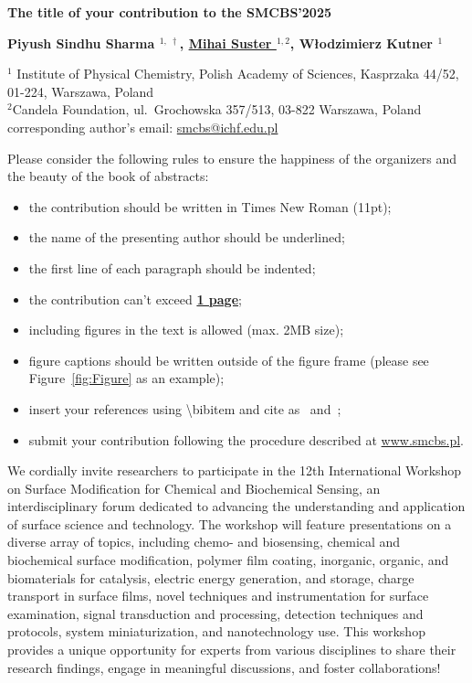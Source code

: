 \documentclass[11pt]{article}
\newcommand{\abstracttitle}[1]{
\setstretch{1.15}	%
 \begin{center}{\Large {\bf #1}}\end{center}
\setstretch{1.0}
}
\newcommand{\authors}[1]{
 \begin{center}{\bf #1} \end{center}
 \setstretch{1.0}
}
\newcommand{\addresses}[1]{
\setstretch{0.95}
 \begin{center}{\small #1} \end{center}
\setstretch{1}
}
\begin{document}
\abstracttitle{The title of your contribution to the SMCBS'2025}
\authors{
Piyush Sindhu Sharma $^{1,~\dag}$,
\underline{Mihai Suster $^{1,2}$},
Włodzimierz Kutner $^{1}$
} 

\addresses{%
$^{1}$ Institute of Physical Chemistry, Polish Academy of Sciences, Kasprzaka 44/52, 01-224, Warszawa, Poland \\
$^{2}$Candela Foundation, ul.~Grochowska 357/513, 03-822 Warszawa, Poland \\
\dag corresponding author's email:  \href{mailto:smcbs@ichf.edu.pl}{smcbs@ichf.edu.pl}
}


	Please consider the following rules to ensure the happiness of the organizers and the beauty of the book of abstracts:
\begin{itemize}	
\item the contribution should be written in Times New Roman (11pt);
\item the name of the presenting author should be underlined;
\item the first line of each paragraph should be indented;
\item the contribution can't exceed \textbf{\underline{1 page}};
\item including figures in the text is allowed (max. 2MB size);
\item figure captions should be written outside of the figure frame (please see Figure~\ref{fig:Figure} as an example);
\item insert your references using \textbackslash bibitem and cite as~\cite{AuthorsAB2024} and~\cite{AuthorsCDE2023};
\item submit your contribution following the procedure described at \url{www.smcbs.pl}.
\end{itemize}

We cordially invite researchers to participate in the 12th International Workshop on Surface Modification for Chemical and Biochemical Sensing, an interdisciplinary forum dedicated to advancing the understanding and application of surface science and technology. The workshop will feature presentations on a diverse array of topics, including chemo- and biosensing, chemical and biochemical surface modification, polymer film coating, inorganic, organic, and biomaterials for catalysis, electric energy generation, and storage, charge transport in surface films, novel techniques and instrumentation for surface examination, signal transduction and processing, detection techniques and protocols, system miniaturization, and nanotechnology use. This workshop provides a unique opportunity for experts from various disciplines to share their research findings, engage in meaningful discussions, and foster collaborations!
\end{document}
